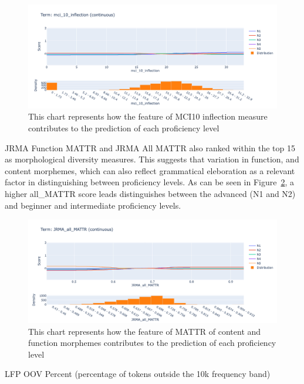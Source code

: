 \begin{figure}[h!]
    \centering
    \includegraphics[scale=.4]{img/EBM/MCI10inflection}
    \caption[Contribution of MCI 10 Inflection measure]{This chart represents how the feature of MCI10 inflection measure contributes to the prediction of each proficiency level}
    \label{fig:EBMMCI10inflection}
\end{figure}

JRMA Function MATTR and JRMA All MATTR also ranked within the top 15 as morphological diversity measures. This
suggests that variation in function, and content morphemes, which can also reflect grammatical eleboration as a
relevant factor in distinguishing between proficiency levels. As can be seen in Figure~\ref{fig:JRMAallMATTR}, a higher
all_MATTR
score leads distinguishes between the advanced (N1 and N2) and beginner and intermediate proficiency levels.

\begin{figure}[h!]
    \centering
    \includegraphics[scale=.4]{img/EBM/JRMAallMATTR}
    \caption[Contribution of JRMA function and content morphemes]{This chart represents how the feature of MATTR of content and function morphemes contributes to the prediction of each proficiency level}
    \label{fig:JRMAallMATTR}
\end{figure}


LFP OOV Percent (percentage of tokens outside the 10k frequency band)


